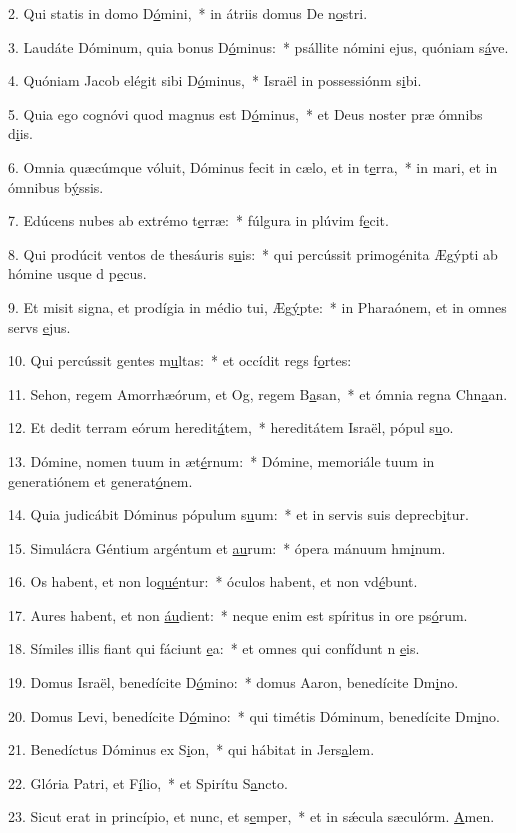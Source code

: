 2. Qui statis in domo D\uline{ó}mini,~* in átriis domus De n\uline{o}stri.\par 
3. Laudáte Dóminum, quia bonus D\uline{ó}minus:~* psállite nómini ejus, quóniam s\uline{á}ve.\par 
4. Quóniam Jacob elégit sibi D\uline{ó}minus,~* Israël in possessiónm s\uline{i}bi.\par 
5. Quia ego cognóvi quod magnus est D\uline{ó}minus,~* et Deus noster præ ómnibs d\uline{i}is.\par 
6. Omnia quæcúmque vóluit, Dóminus fecit in cælo, et in t\uline{e}rra,~* in mari, et in ómnibus b\uline{ý}ssis.\par 
7. Edúcens nubes ab extrémo t\uline{e}rræ:~* fúlgura in plúvim f\uline{e}cit.\par 
8. Qui prodúcit ventos de thesáuris s\uline{u}is:~* qui percússit primogénita Ægýpti ab hómine usque d p\uline{e}cus.\par 
9. Et misit signa, et prodígia in médio tui, Æg\uline{ý}pte:~* in Pharaónem, et in omnes servs \uline{e}jus.\par 
10. Qui percússit gentes m\uline{u}ltas:~* et occídit regs f\uline{o}rtes:\par 
11. Sehon, regem Amorrhæórum, et Og, regem B\uline{a}san,~* et ómnia regna Chn\uline{a}an.\par 
12. Et dedit terram eórum heredit\uline{á}tem,~* hereditátem Israël, pópul s\uline{u}o.\par 
13. Dómine, nomen tuum in æt\uline{é}rnum:~* Dómine, memoriále tuum in generatiónem et generat\uline{ó}nem.\par 
14. Quia judicábit Dóminus pópulum s\uline{u}um:~* et in servis suis deprecb\uline{i}tur.\par 
15. Simulácra Géntium argéntum et \uline{au}rum:~* ópera mánuum hm\uline{i}num.\par 
16. Os habent, et non lo\uline{qué}ntur:~* óculos habent, et non vd\uline{é}bunt.\par 
17. Aures habent, et non \uline{áu}dient:~* neque enim est spíritus in ore ps\uline{ó}rum.\par 
18. Símiles illis fiant qui fáciunt \uline{e}a:~* et omnes qui confídunt n \uline{e}is.\par 
19. Domus Israël, benedícite D\uline{ó}mino:~* domus Aaron, benedícite Dm\uline{i}no.\par 
20. Domus Levi, benedícite D\uline{ó}mino:~* qui timétis Dóminum, benedícite Dm\uline{i}no.\par 
21. Benedíctus Dóminus ex S\uline{i}on,~* qui hábitat in Jers\uline{a}lem.\par 
22. Glória Patri, et F\uline{í}lio,~* et Spirítu S\uline{a}ncto.\par 
23. Sicut erat in princípio, et nunc, et s\uline{e}mper,~* et in sǽcula sæculórm. \uline{A}men.\par 
